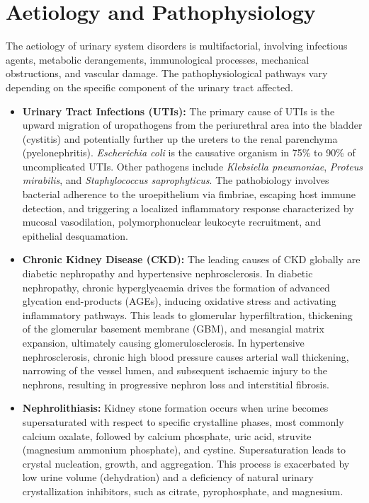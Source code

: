 \section*{Aetiology and Pathophysiology}
The aetiology of urinary system disorders is multifactorial, involving infectious agents, metabolic derangements, immunological processes, mechanical obstructions, and vascular damage. The pathophysiological pathways vary depending on the specific component of the urinary tract affected.

\begin{itemize}
    \item \textbf{Urinary Tract Infections (UTIs):} The primary cause of UTIs is the upward migration of uropathogens from the periurethral area into the bladder (cystitis) and potentially further up the ureters to the renal parenchyma (pyelonephritis). \textit{Escherichia coli} is the causative organism in 75\% to 90\% of uncomplicated UTIs. Other pathogens include \textit{Klebsiella pneumoniae}, \textit{Proteus mirabilis}, and \textit{Staphylococcus saprophyticus}. The pathobiology involves bacterial adherence to the uroepithelium via fimbriae, escaping host immune detection, and triggering a localized inflammatory response characterized by mucosal vasodilation, polymorphonuclear leukocyte recruitment, and epithelial desquamation.
    \item \textbf{Chronic Kidney Disease (CKD):} The leading causes of CKD globally are diabetic nephropathy and hypertensive nephrosclerosis. In diabetic nephropathy, chronic hyperglycaemia drives the formation of advanced glycation end-products (AGEs), inducing oxidative stress and activating inflammatory pathways. This leads to glomerular hyperfiltration, thickening of the glomerular basement membrane (GBM), and mesangial matrix expansion, ultimately causing glomerulosclerosis. In hypertensive nephrosclerosis, chronic high blood pressure causes arterial wall thickening, narrowing of the vessel lumen, and subsequent ischaemic injury to the nephrons, resulting in progressive nephron loss and interstitial fibrosis.
    \item \textbf{Nephrolithiasis:} Kidney stone formation occurs when urine becomes supersaturated with respect to specific crystalline phases, most commonly calcium oxalate, followed by calcium phosphate, uric acid, struvite (magnesium ammonium phosphate), and cystine. Supersaturation leads to crystal nucleation, growth, and aggregation. This process is exacerbated by low urine volume (dehydration) and a deficiency of natural urinary crystallization inhibitors, such as citrate, pyrophosphate, and magnesium.

\end{itemize}
